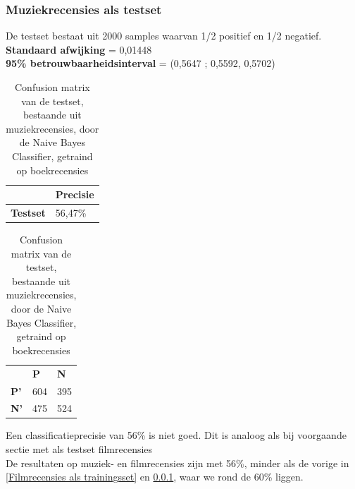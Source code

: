 \subsubsection{Muziekrecensies als testset}\label{Muziekrecensies als testset}

De testset bestaat uit 2000 samples waarvan 1/2 positief en 1/2 negatief.\\
\textbf{Standaard afwijking} = 0,01448\\
\textbf{95\% betrouwbaarheidsinterval} = (0,5647 ; 0,5592, 0,5702)

\begin{table}[h]
\centering
\setlength\tabcolsep{4pt}
\begin{minipage}[t!]{0.48\textwidth}
\centering
\begin{tabular}{l|l|}
\cline{2-2}
                                            & \textbf{Precisie} \\ \hline
\multicolumn{1}{|l|}{\textbf{Testset}}      & 56,47\%           \\ \hline
\end{tabular}
\caption{Classificatieprecisie Naive Bayes Classifier, getraind op boekrecensies, getest op muziekrecensies}
\end{minipage}%
\hfill
\begin{minipage}[t!]{0.48\textwidth}
\centering
\begin{tabular}{lll}
                                 & \textbf{P}               & \textbf{N}               \\ \cline{2-3} 
\multicolumn{1}{l|}{\textbf{P'}} & \multicolumn{1}{l|}{604} & \multicolumn{1}{l|}{395} \\ \cline{2-3} 
\multicolumn{1}{l|}{\textbf{N'}} & \multicolumn{1}{l|}{475} & \multicolumn{1}{l|}{524} \\ \cline{2-3} 
\end{tabular}
\caption{Confusion matrix van de testset, bestaande uit muziekrecensies, door de  Naive Bayes Classifier, getraind op boekrecensies} 
\end{minipage}
\end{table}

Een classificatieprecisie van 56\% is niet goed. Dit is analoog als bij voorgaande sectie met als testset filmrecensies\\

De resultaten op muziek- en filmrecensies zijn met 56\%, minder als de vorige in \ref{Filmrecensies als trainingsset} en \ref{Muziekrecensies als testset}, waar we rond de 60\% liggen.

